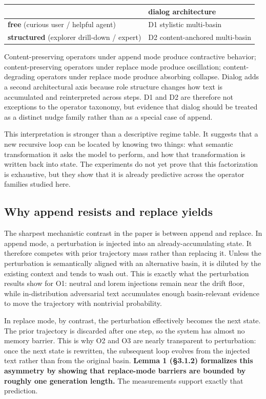 \documentclass{article}
\theoremstyle{plain}
\theoremstyle{definition}
\begin{document}
\begin{table}[h!]
\centering
\small
\begin{tabular}{ll}
\toprule
 & dialog architecture \\
\midrule
\textbf{free} (curious user / helpful agent) & D1 stylistic multi-basin \\
\textbf{structured} (explorer drill-down / expert) & D2 content-anchored multi-basin \\
\bottomrule
\end{tabular}
\end{table}

Content-preserving operators under append mode produce contractive
behavior; content-preserving operators under replace mode produce
oscillation; content-degrading operators under replace mode produce
absorbing collapse. Dialog adds a second architectural axis because
role structure changes how text is accumulated and reinterpreted
across steps. D1 and D2 are therefore not exceptions to the operator
taxonomy, but evidence that dialog should be treated as a distinct
nudge family rather than as a special case of append.

This interpretation is stronger than a descriptive regime table. It
suggests that a new recursive loop can be located by knowing two
things: what semantic transformation it asks the model to perform,
and how that transformation is written back into state. The
experiments do not yet prove that this factorization is exhaustive,
but they show that it is already predictive across the operator
families studied here.

\subsection{Why append resists and replace yields}

The sharpest mechanistic contrast in the paper is between append and
replace. In append mode, a perturbation is injected into an
already-accumulating state. It therefore competes with prior
trajectory mass rather than replacing it. Unless the perturbation is
semantically aligned with an alternative basin, it is diluted by the
existing context and tends to wash out. This is exactly what the
perturbation results show for O1: neutral and lorem injections remain
near the drift floor, while in-distribution adversarial text
accumulates enough basin-relevant evidence to move the trajectory
with nontrivial probability.

In replace mode, by contrast, the perturbation effectively becomes
the next state. The prior trajectory is discarded after one step, so
the system has almost no memory barrier. This is why O2 and O3 are
nearly transparent to perturbation: once the next state is rewritten,
the subsequent loop evolves from the injected text rather than from
the original basin. \textbf{Lemma 1 (§3.1.2) formalizes this asymmetry by
showing that replace-mode barriers are bounded by roughly one
generation length.} The measurements support exactly that prediction.
\end{document}
